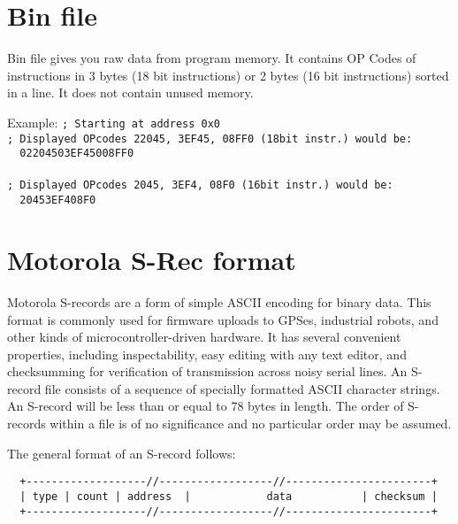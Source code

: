 \section{Bin file}
    Bin file gives you raw data from program memory. It contains OP Codes of instructions in 3 bytes (18 bit instructions) or 2 bytes (16 bit instructions) sorted in a line. It does not contain unused memory.

    Example:
    {
        \usecodefont
        \verb'; Starting at address 0x0'\\
        \verb'; Displayed OPcodes 22045, 3EF45, 08FF0 (18bit instr.) would be:'\\
        \verb'  02204503EF45008FF0 '\\\\
        \verb'; Displayed OPcodes 2045, 3EF4, 08F0 (16bit instr.) would be:'\\
        \verb'  20453EF408F0 '\\
    }

\section{Motorola S-Rec format}
    Motorola S-records are a form of simple ASCII encoding for binary data. This format is commonly used for firmware uploads to GPSes, industrial robots, and other kinds of microcontroller-driven hardware. It has several convenient properties, including inspectability, easy editing with any text editor, and checksumming for verification of transmission across noisy serial lines. An S-record file consists of a sequence of specially formatted ASCII character strings. An S-record will be less than or equal to 78 bytes in length. The order of S-records within a file is of no significance and no particular order may be assumed.

    The general format of an S-record follows:

    {
        \usecodefont
        \verb'  +-------------------//------------------//-----------------------+'\\
        \verb'  | type | count | address  |            data           | checksum |'\\
        \verb'  +-------------------//------------------//-----------------------+'\\
    }

